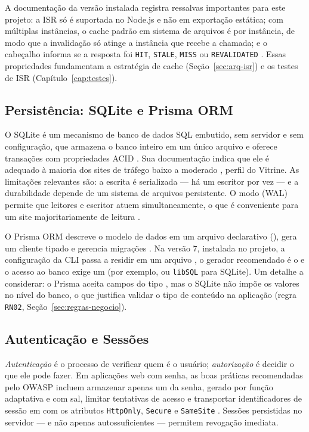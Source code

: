 A documentação da versão instalada registra ressalvas importantes para este projeto: a ISR só é suportada no  Node.js e não em exportação estática; com múltiplas instâncias, o cache padrão em sistema de arquivos é por instância, de modo que a invalidação só atinge a instância que recebe a chamada; e o cabeçalho  informa se a resposta foi \texttt{HIT}, \texttt{STALE}, \texttt{MISS} ou \texttt{REVALIDATED} \cite{nextjsdocs}. Essas propriedades fundamentam a estratégia de cache (Seção~\ref{sec:arq-isr}) e os testes de ISR (Capítulo~\ref{cap:testes}).

\subsection{Persistência: SQLite e Prisma ORM}\label{sec:fund-sqlite}

O SQLite é um mecanismo de banco de dados SQL embutido, sem servidor e sem configuração, que armazena o banco inteiro em um único arquivo e oferece transações com propriedades ACID \cite{sqliteabout}. Sua documentação indica que ele é adequado à maioria dos sites de tráfego baixo a moderado \cite{sqlitewhentouse}, perfil do Vitrine. As limitações relevantes são: a escrita é serializada --- há um escritor por vez --- e a durabilidade depende de um sistema de arquivos persistente. O modo  (WAL) permite que leitores e escritor atuem simultaneamente, o que é conveniente para um site majoritariamente de leitura \cite{sqlitewal}.

O Prisma ORM descreve o modelo de dados em um arquivo declarativo (), gera um cliente tipado e gerencia migrações \cite{prismadocs}. Na versão 7, instalada no projeto, a configuração da CLI passa a residir em um arquivo , o gerador recomendado é o  e o acesso ao banco exige um \emph{} (por exemplo,  ou \texttt{libSQL} para SQLite). Um detalhe a considerar: o Prisma aceita campos do tipo , mas o SQLite não impõe os valores no nível do banco, o que justifica validar o tipo de conteúdo na aplicação (regra \texttt{RN02}, Seção~\ref{sec:regras-negocio}).

\subsection{Autenticação e Sessões}\label{sec:fund-auth}

\emph{Autenticação} é o processo de verificar quem é o usuário; \emph{autorização} é decidir o que ele pode fazer. Em aplicações web com senha, as boas práticas recomendadas pelo OWASP incluem armazenar apenas um  da senha, gerado por função adaptativa e com sal, limitar tentativas de acesso e transportar identificadores de sessão em  com os atributos \texttt{HttpOnly}, \texttt{Secure} e \texttt{SameSite} \cite{owaspcheatsheets,owaspasvs}. Sessões persistidas no servidor --- e não apenas  autossuficientes --- permitem revogação imediata.

